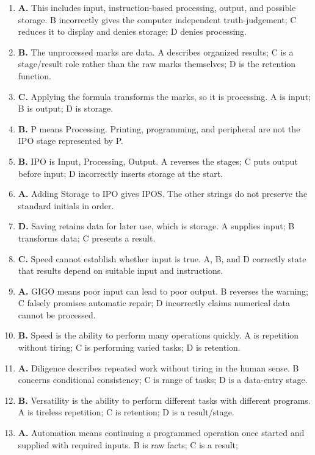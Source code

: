 \begin{enumerate}[label=\textbf{Q\arabic*.}, leftmargin=*]
\item \textbf{A.} This includes input, instruction-based processing, output,
  and possible storage. B incorrectly gives the computer independent
  truth-judgement; C reduces it to display and denies storage; D denies
  processing.
\item \textbf{B.} The unprocessed marks are data. A describes organized
  results; C is a stage/result role rather than the raw marks themselves; D
  is the retention function.
\item \textbf{C.} Applying the formula transforms the marks, so it is
  processing. A is input; B is output; D is storage.
\item \textbf{B.} P means Processing. Printing, programming, and peripheral
  are not the IPO stage represented by P.
\item \textbf{B.} IPO is Input, Processing, Output. A reverses the stages; C
  puts output before input; D incorrectly inserts storage at the start.
\item \textbf{A.} Adding Storage to IPO gives IPOS. The other strings do not
  preserve the standard initials in order.
\item \textbf{D.} Saving retains data for later use, which is storage. A
  supplies input; B transforms data; C presents a result.
\item \textbf{C.} Speed cannot establish whether input is true. A, B, and D
  correctly state that results depend on suitable input and instructions.
\item \textbf{A.} GIGO means poor input can lead to poor output. B reverses
  the warning; C falsely promises automatic repair; D incorrectly claims
  numerical data cannot be processed.
\item \textbf{B.} Speed is the ability to perform many operations quickly. A
  is repetition without tiring; C is performing varied tasks; D is retention.
\item \textbf{A.} Diligence describes repeated work without tiring in the
  human sense. B concerns conditional consistency; C is range of tasks; D is
  a data-entry stage.
\item \textbf{B.} Versatility is the ability to perform different tasks with
  different programs. A is tireless repetition; C is retention; D is a
  result/stage.
\item \textbf{A.} Automation means continuing a programmed operation once
  started and supplied with required inputs. B is raw facts; C is a result;

\end{enumerate}
